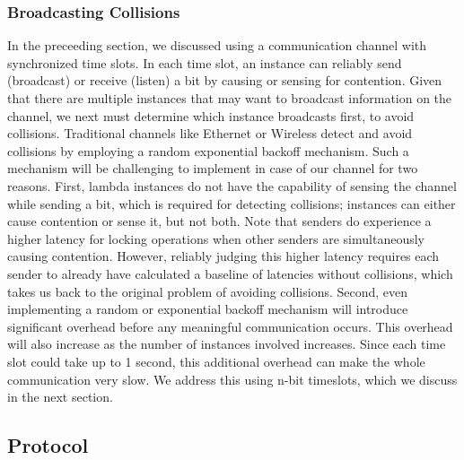 \subsubsection{Broadcasting Collisions}
In the preceeding section, we discussed using a communication channel with
synchronized time slots. In each time slot, an instance can reliably send
(broadcast) or receive (listen) a bit by causing or sensing for contention.
Given that there are multiple instances that may want to broadcast information
on the channel, we next must determine which instance broadcasts first, to avoid
collisions. Traditional channels like Ethernet or Wireless detect and avoid
collisions by employing a random exponential backoff mechanism.  Such a
mechanism will be challenging to implement in case of our channel for two
reasons. First, lambda instances do not have the capability of sensing the
channel while sending a bit, which is required for detecting collisions;
instances can either cause contention or sense it, but not both. Note that
senders do experience a higher latency for locking operations when other senders
are simultaneously causing contention. However, reliably judging this higher
latency requires each sender to already have calculated a baseline of latencies
without collisions, which takes us back to the original problem of avoiding
collisions.  Second, even implementing a random or exponential backoff mechanism
will introduce significant overhead before any meaningful communication occurs.
This overhead will also increase as the number of instances involved increases.
Since each time slot could take up to 1 second, this additional overhead can
make the whole communication very slow. We address this using n-bit timeslots,
which we discuss in the next section.

\subsection{Protocol}
\label{sec:protocol}


